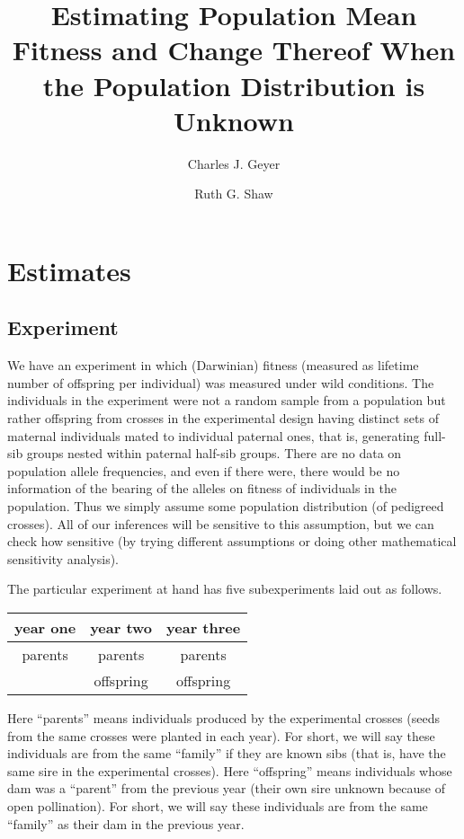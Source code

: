 \documentclass[11pt]{article}
\begin{document}
\title{Estimating Population Mean Fitness and Change Thereof When
    the Population Distribution is Unknown}

\author{Charles J. Geyer \and Ruth G. Shaw}

\maketitle

\section{Estimates}

\subsection{Experiment}

We have an experiment in which (Darwinian) fitness (measured as lifetime
number of offspring per individual) was measured under wild conditions.
The individuals in the experiment were not a random sample from
a population but rather offspring from crosses in the experimental design having distinct sets of maternal
individuals mated to individual paternal ones, that is,
generating full-sib groups nested within paternal half-sib
groups.  There are no data on
population allele frequencies, and even if there were, there would be
no information of the bearing of the alleles on fitness of individuals in the population. 
Thus we simply assume some population distribution (of
pedigreed crosses).  All of our inferences will be sensitive to this
assumption, but we can check how sensitive (by trying different assumptions
or doing other mathematical sensitivity analysis).

The particular experiment at hand has five subexperiments laid out as follows.
\begin{center}
\begin{tabular}{ccc}
\toprule
year one & year two & year three \\
\midrule
parents & parents & parents \\
        & offspring & offspring \\
\bottomrule
\end{tabular}
\end{center}
Here ``parents'' means individuals produced by the experimental crosses (seeds from
the same crosses were planted in each year).  For short, we will say these
individuals are from the same ``family'' if they are known sibs
(that is, have the same sire in the experimental crosses).
Here ``offspring'' means individuals whose dam was a ``parent'' from the
previous year (their own sire unknown because of open pollination).
For short, we will say these
individuals are from the same ``family'' as their dam in the previous year.
\end{document}
